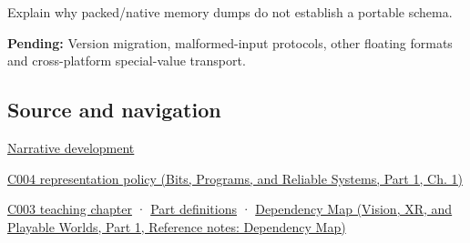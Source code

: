 \hypertarget{appendix-91d09ebed979-recall-and-next-depth}{}

Explain why packed/native memory dumps do not establish a portable schema.

\textbf{Pending:} Version migration, malformed-input protocols, other floating formats and cross-platform special-value transport.

\subsection{Source and navigation}\label{appendix-91d09ebed979-source-and-navigation}

\hypertarget{appendix-91d09ebed979-source-and-navigation}{}

\hyperref[01-foundations-i-ch002-bytes-become-a-durable-agreement]{Narrative development}

\href{../01-Bits-Programs-and-Reliable-Systems-P01/main.pdf\#nameddest=01-foundations-i-ch001-a-stretching-ruler-for-real-valued-quantities}{C004 representation policy (Bits, Programs, and Reliable Systems, Part 1, Ch. 1)}

\hyperref[01-foundations-i-ch002-where-the-bytes-live]{C003 teaching chapter} · \hyperref[appendix-fd090d982a15-m003---parts-41-60]{Part definitions} · \href{../07-Vision-XR-and-Playable-Worlds-P01/main.pdf\#nameddest=appendix-4ad47bdd269a}{Dependency Map (Vision, XR, and Playable Worlds, Part 1, Reference notes: Dependency Map)}
